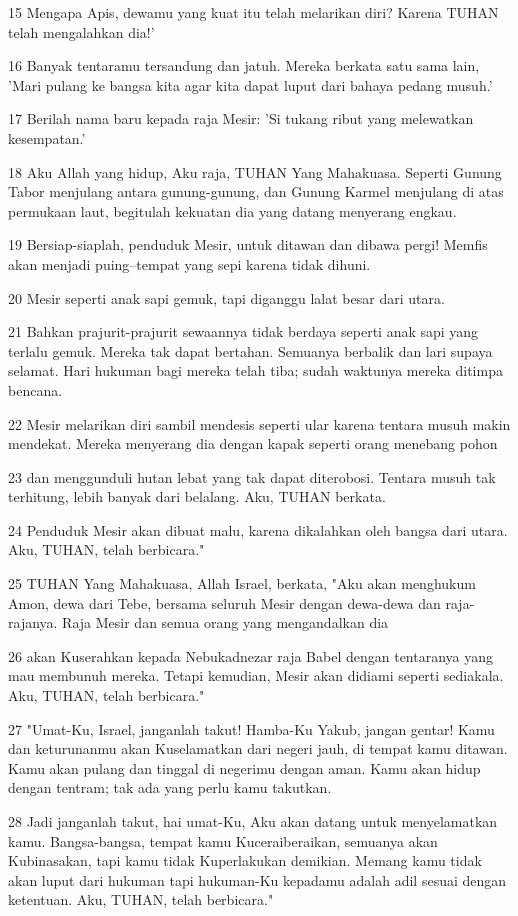 \par 15 Mengapa Apis, dewamu yang kuat itu telah melarikan diri? Karena TUHAN telah mengalahkan dia!'
\par 16 Banyak tentaramu tersandung dan jatuh. Mereka berkata satu sama lain, 'Mari pulang ke bangsa kita agar kita dapat luput dari bahaya pedang musuh.'
\par 17 Berilah nama baru kepada raja Mesir: 'Si tukang ribut yang melewatkan kesempatan.'
\par 18 Aku Allah yang hidup, Aku raja, TUHAN Yang Mahakuasa. Seperti Gunung Tabor menjulang antara gunung-gunung, dan Gunung Karmel menjulang di atas permukaan laut, begitulah kekuatan dia yang datang menyerang engkau.
\par 19 Bersiap-siaplah, penduduk Mesir, untuk ditawan dan dibawa pergi! Memfis akan menjadi puing--tempat yang sepi karena tidak dihuni.
\par 20 Mesir seperti anak sapi gemuk, tapi diganggu lalat besar dari utara.
\par 21 Bahkan prajurit-prajurit sewaannya tidak berdaya seperti anak sapi yang terlalu gemuk. Mereka tak dapat bertahan. Semuanya berbalik dan lari supaya selamat. Hari hukuman bagi mereka telah tiba; sudah waktunya mereka ditimpa bencana.
\par 22 Mesir melarikan diri sambil mendesis seperti ular karena tentara musuh makin mendekat. Mereka menyerang dia dengan kapak seperti orang menebang pohon
\par 23 dan menggunduli hutan lebat yang tak dapat diterobosi. Tentara musuh tak terhitung, lebih banyak dari belalang. Aku, TUHAN berkata.
\par 24 Penduduk Mesir akan dibuat malu, karena dikalahkan oleh bangsa dari utara. Aku, TUHAN, telah berbicara."
\par 25 TUHAN Yang Mahakuasa, Allah Israel, berkata, "Aku akan menghukum Amon, dewa dari Tebe, bersama seluruh Mesir dengan dewa-dewa dan raja-rajanya. Raja Mesir dan semua orang yang mengandalkan dia
\par 26 akan Kuserahkan kepada Nebukadnezar raja Babel dengan tentaranya yang mau membunuh mereka. Tetapi kemudian, Mesir akan didiami seperti sediakala. Aku, TUHAN, telah berbicara."
\par 27 "Umat-Ku, Israel, janganlah takut! Hamba-Ku Yakub, jangan gentar! Kamu dan keturunanmu akan Kuselamatkan dari negeri jauh, di tempat kamu ditawan. Kamu akan pulang dan tinggal di negerimu dengan aman. Kamu akan hidup dengan tentram; tak ada yang perlu kamu takutkan.
\par 28 Jadi janganlah takut, hai umat-Ku, Aku akan datang untuk menyelamatkan kamu. Bangsa-bangsa, tempat kamu Kuceraiberaikan, semuanya akan Kubinasakan, tapi kamu tidak Kuperlakukan demikian. Memang kamu tidak akan luput dari hukuman tapi hukuman-Ku kepadamu adalah adil sesuai dengan ketentuan. Aku, TUHAN, telah berbicara."

